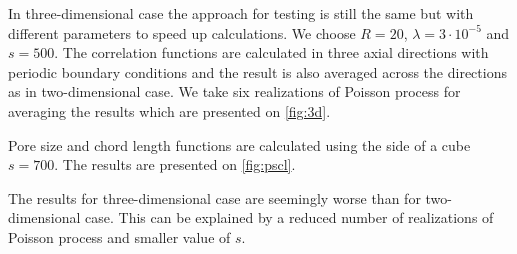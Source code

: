 \documentclass[reprint,amsmath,amssymb,aps,pre,nofootinbib]{revtex4-1}
\begin{document}
In three-dimensional case the approach for testing is still the same but with
different parameters to speed up calculations. We choose $R = 20$,
$\lambda = 3\cdot10^{-5}$ and $s = 500$. The correlation functions are
calculated in three axial directions with periodic boundary conditions and the
result is also averaged across the directions as in two-dimensional
case. We take six realizations of Poisson process for averaging the results
which are presented on \cref{fig:3d}.

Pore size and chord length functions are calculated using the side of a cube
$s = 700$. The results are presented on \cref{fig:pscl}.

The results for three-dimensional case are seemingly worse than for
two-dimensional case. This can be explained by a reduced number of realizations
of Poisson process and smaller value of $s$.
\end{document}
